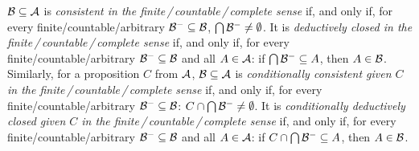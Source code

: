 $\begin{cal}B\end{cal}\subseteq\begin{cal}A\end{cal}$ is \emph{consistent in the finite\,/\,countable\,/\,complete sense} if, and only if, for every finite/countable/arbitrary $\begin{cal}B\end{cal}^-\subseteq\begin{cal}B\end{cal}$, $\bigcap\begin{cal}B\end{cal}^-\neq\emptyset$. It is \emph{deductively closed in the finite\,/\,countable\,/\,complete sense} if, and only if, for every finite/countable/arbitrary $\begin{cal}B\end{cal}^-\subseteq\begin{cal}B\end{cal}$ and all $A\in\begin{cal}A\end{cal}$: if $\bigcap\begin{cal}B\end{cal}^-\subseteq A$, then $A\in\begin{cal}B\end{cal}$. Similarly, for a proposition $C$ from $\cal A$, $\begin{cal}B\end{cal}\subseteq\begin{cal}A\end{cal}$ is \emph{conditionally consistent given $C$ in the finite\,/\,countable\,/\,complete sense} if, and only if, for every finite/countable/arbitrary $\begin{cal}B\end{cal}^-\subseteq\begin{cal}B\end{cal}$: $C\cap\bigcap\begin{cal}B\end{cal}^-\neq\emptyset$. It is \emph{conditionally deductively closed given $C$ in the finite\,/\,countable\,/\,complete sense} if, and only if, for every finite/countable/arbitrary $\begin{cal}B\end{cal}^-\subseteq\begin{cal}B\end{cal}$ and all $A\in\begin{cal}A\end{cal}$: if $C\cap\bigcap\begin{cal}B\end{cal}^-\subseteq A$, then $A\in\begin{cal}B\end{cal}$.


